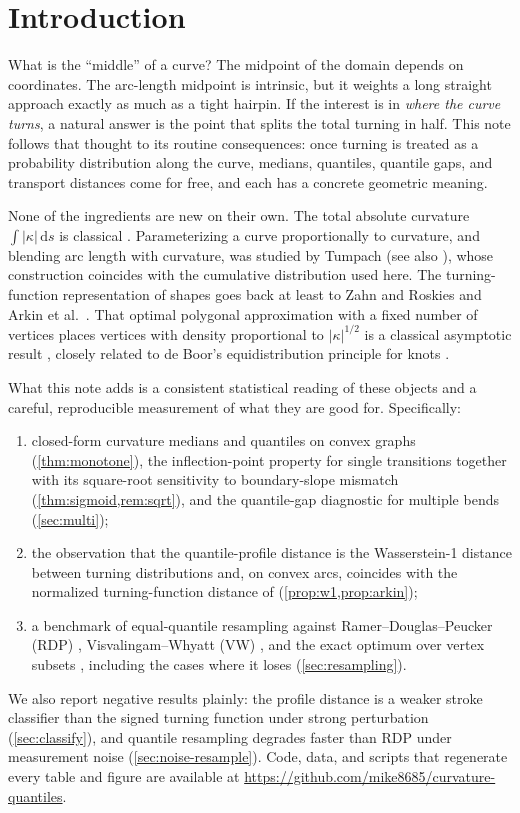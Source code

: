 \documentclass[11pt]{amsart}
\theoremstyle{definition}
\theoremstyle{remark}
\newcommand{\dd}{\,\mathrm{d}}
\newcommand{\repo}{\url{https://github.com/mike8685/curvature-quantiles}}
\begin{document}
\section{Introduction}

What is the ``middle'' of a curve? The midpoint of the domain depends on coordinates. The arc-length midpoint is intrinsic, but it weights a long straight approach exactly as much as a tight hairpin. If the interest is in \emph{where the curve turns}, a natural answer is the point that splits the total turning in half. This note follows that thought to its routine consequences: once turning is treated as a probability distribution along the curve, medians, quantiles, quantile gaps, and transport distances come for free, and each has a concrete geometric meaning.

None of the ingredients are new on their own. The total absolute curvature $\int|\kappa|\dd s$ is classical \cite{fenchel1929,milnor1950}. Parameterizing a curve proportionally to curvature, and blending arc length with curvature, was studied by Tumpach \cite{tumpach2023canonical} (see also \cite{ciuclea2025geometric}), whose construction coincides with the cumulative distribution used here. The turning-function representation of shapes goes back at least to Zahn and Roskies \cite{zahn1972fourier} and Arkin et al.\ \cite{arkin1991metric}. That optimal polygonal approximation with a fixed number of vertices places vertices with density proportional to $|\kappa|^{1/2}$ is a classical asymptotic result \cite{fejestoth1948,mcclure1975,glasauer1996}, closely related to de Boor's equidistribution principle for knots \cite{deboor1974}.

What this note adds is a consistent statistical reading of these objects and a careful, reproducible measurement of what they are good for. Specifically:
\begin{enumerate}
\item closed-form curvature medians and quantiles on convex graphs (\cref{thm:monotone}), the inflection-point property for single transitions together with its square-root sensitivity to boundary-slope mismatch (\cref{thm:sigmoid,rem:sqrt}), and the quantile-gap diagnostic for multiple bends (\cref{sec:multi});
\item the observation that the quantile-profile distance is the Wasserstein-1 distance between turning distributions and, on convex arcs, coincides with the normalized turning-function distance of \cite{arkin1991metric} (\cref{prop:w1,prop:arkin});
\item a benchmark of equal-quantile resampling against Ramer--Douglas--Peucker (RDP) \cite{ramer1972,douglas1973}, Visvalingam--Whyatt (VW) \cite{visvalingam1993}, and the exact optimum over vertex subsets \cite{imai1986,perez1994,chin1996}, including the cases where it loses (\cref{sec:resampling}).
\end{enumerate}
We also report negative results plainly: the profile distance is a weaker stroke classifier than the signed turning function under strong perturbation (\cref{sec:classify}), and quantile resampling degrades faster than RDP under measurement noise (\cref{sec:noise-resample}). Code, data, and scripts that regenerate every table and figure are available at \repo.
\end{document}
